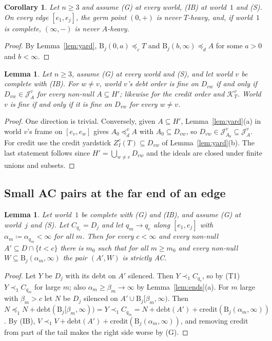 \documentclass[11pt]{article}
\newtheorem{lemma}[theorem]{Lemma}
\newtheorem{corollary}[theorem]{Corollary}
\theoremstyle{definition}\newtheorem{definition}[theorem]{Definition}
\theoremstyle{remark}\newtheorem{remark}[theorem]{Remark}
\newcommand{\debt}{\mathrm{debt}}
\newcommand{\cred}{\mathrm{credit}}
\newcommand{\Band}{\mathrm{B}}
\newcommand{\Jid}{\mathcal J}
\newcommand{\Kid}{\mathcal K}
\begin{document}
\begin{corollary}\label{cor:X5}
Let $n\ge3$ and assume (G) at every world, (IB) at world~$1$ and (S).
On every edge $[e_1,e_j]$, the germ point $(0,+)$ is never $T$-heavy, and,
if world~$1$ is complete, $(\infty,-)$ is never $A$-heavy.
\end{corollary}
\begin{proof}
By Lemma~\ref{lem:yard}, $\Band_j(0,a)\preceq_cT$ and
$\Band_j(b,\infty)\preceq_dA$ for some $a>0$ and $b<\infty$.
\end{proof}

\begin{lemma}\label{lem:fineregion}
Let $n\ge3$, assume (G) at every world and (S), and let world $v$ be complete
with (IB). For $w\ne v$, world $v$'s debt order is fine on $D_{vw}$ if and
only if $D_{vw}\in\Jid^v_A$ for every non-null $A\subseteq H'$; likewise for
the credit order and $\Kid^v_T$. World $v$ is fine if and only if it is fine
on $D_{vw}$ for every $w\ne v$.
\end{lemma}
\begin{proof}
One direction is trivial. Conversely, given $A\subseteq H'$,
Lemma~\ref{lem:yard}(a) in world $v$'s frame on $[e_v,e_w]$ gives
$A_0\preceq^v_dA$ with $A_0\subseteq D_{vw}$, so
$D_{vw}\in\Jid^v_{A_0}\subseteq\Jid^v_A$. For credit use the credit
yardstick $Z^c_I(T)\subseteq D_{vw}$ of Lemma~\ref{lem:yard}(b). The last
statement follows since $H'=\bigcup_{w\ne v}D_{vw}$ and the ideals are
closed under finite unions and subsets.
\end{proof}

\subsection{Small AC pairs at the far end of an edge}

\begin{lemma}\label{lem:SAC}
Let world~$1$ be complete with (G) and (IB), and assume (G) at world~$j$ and
(S). Let $C_{q_e}=D_j$ and let $q_m\to q_e$ along $[e_1,e_j]$ with
$\alpha_m\coloneqq\alpha_{q_m}<\infty$ for all $m$. Then for every $c<\infty$
and every non-null $A'\subseteq D\cap\{t<c\}$ there is $m_0$ such that for
all $m\ge m_0$ and every non-null $W\subseteq\Band_j(\alpha_m,\infty)$ the
pair $(A',W)$ is strictly AC.
\end{lemma}
\begin{proof}
Let $Y$ be $D_j$ with its debt on $A'$ silenced. Then $Y\prec_1C_{q_e}$, so
by (T1) $Y\prec_1C_{q_m}$ for large $m$; also $\alpha_m\ge\beta_m\to\infty$
by Lemma~\ref{lem:ends}(a). For $m$ large with $\beta_m>c$ let $N$ be $D_j$
silenced on $A'\cup\Band_j[\beta_m,\infty)$. Then
$N\preceq_1N+\debt(\Band_j[\beta_m,\infty))=Y\prec_1C_{q_m}
=N+\debt(A')+\cred(\Band_j(\alpha_m,\infty))$. By (IB),
$V\prec_1V+\debt(A')+\cred(\Band_j(\alpha_m,\infty))$, and removing credit
from part of the tail makes the right side worse by (G).
\end{proof}
\end{document}
